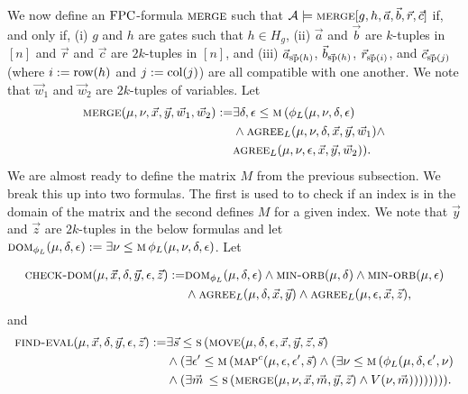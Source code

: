 \documentclass[../main/thesis.tex]{subfiles}
\begin{document}
We now define an $\text{\upshape FPC}$-formula $\textsc{merge}$ such that $\mathcal{A} \models
\textsc{merge}[g, h, \vec{a}, \vec{b}, \vec{r}, \vec{c}]$ if, and only if, (i) $g$
and $h$ are gates such that $h \in H_g$, (ii) $\vec{a}$ and $\vec{b}$ are
$k$-tuples in $[n]$ and $\vec{r}$ and $\vec{c}$ are $2k$-tuples in $[n]$, and
(iii) $\vec{a}_{\vec{\text{sp}}(h)}$, $\vec{b}_{\vec{\text{sp}}(h)}$,
$\vec{r}_{\vec{\text{sp}}(i)}$, and $\vec{c}_{\vec{\text{sp}}(j)}$ (where $i := \text{row}
(h)$ and $j := \text{col} (j)$) are all compatible with one another. We note that
$\vec{w}_1$ and $\vec{w}_2$ are $2k$-tuples of variables. Let
\begin{align*}
	\textsc{merge} (\mu, \nu, \vec{x}, \vec{y}, \vec{w}_1, \vec{w}_2) := & \exists \delta, \epsilon \leq \textsc{m} \, ( \phi_L (\mu, \nu, \delta, \epsilon) \\ & \land \textsc{agree}_L (\mu, \nu , \delta, \vec{x}, \vec{y}, \vec{w}_1) \land \\ & \textsc{agree}_L (\mu, \nu , \epsilon, \vec{x}, \vec{y}, \vec{w}_2)).
\end{align*}
We are almost ready to define the matrix $M$ from the previous subsection. We
break this up into two formulas. The first is used to to check if an index is in
the domain of the matrix and the second defines $M$ for a given index. We note
that $\vec{y}$ and $\vec{z}$ are $2k$-tuples in the below formulas and let
$\textsc{dom}_{\phi_L} (\mu, \delta, \epsilon) := \exists \nu \leq \textsc{m} \, \phi_L
(\mu, \nu, \delta, \epsilon)$. Let
				
\begin{align*}
	\textsc{check-dom}(\mu, \vec{x}, \delta, \vec{y}, \epsilon, \vec{z})  := & \textsc{dom}_{\phi_L} (\mu, \delta, \epsilon) \land \textsc{min-orb}(\mu, \delta)\land \textsc{min-orb} (\mu, \epsilon) \\ & \land \textsc{agree}_L (\mu, \delta , \vec{x}, \vec{y}) \land \textsc{agree}_L (\mu, \epsilon , \vec{x}, \vec{z}), 
\end{align*}
and
\begin{align*}
	\textsc{find-eval} (\mu, \vec{x}, \delta, \vec{y}, \epsilon, \vec{z}) := & \exists \vec{s} \leq \textsc{s} \, (\textsc{move}(\mu, \delta, \epsilon, \vec{x}, \vec{y}, \vec{z}, \vec{s}) \\ & \land (\exists \epsilon' \leq \textsc{m} \, (\textsc{map}^c (\mu, \epsilon, \epsilon', \vec{s}) \land (\exists \nu \leq \textsc{m} \, (\phi_L (\mu, \delta, \epsilon', \nu) \\ & \land (\exists \vec{m} \, \leq \textsc{s} \, (\textsc{merge} (\mu, \nu, \vec{x}, \vec{m}, \vec{y}, \vec{z}) \land V(\nu, \vec{m})))))))).
\end{align*}
				
\end{document}
